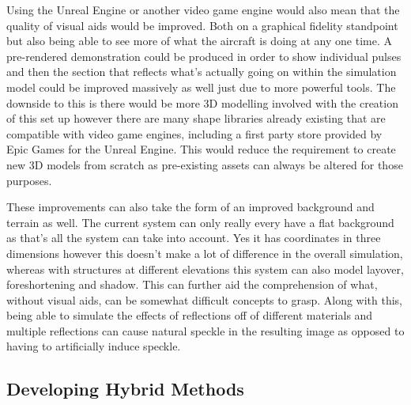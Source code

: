  Using the Unreal Engine or another video game engine would also mean that the quality of visual aids would be improved. Both on a graphical fidelity standpoint but also being able to see more of what the aircraft is doing at any one time. A pre-rendered demonstration could be produced in order to show individual pulses and then the section that reflects what's actually going on within the simulation model could be improved massively as well just due to more powerful tools. The downside to this is there would be more 3D modelling involved with the creation of this set up however there are many shape libraries already existing that are compatible with video game engines, including a first party store provided by Epic Games for the Unreal Engine. This would reduce the requirement to create new 3D models from scratch as pre-existing assets can always be altered for those purposes. \par These improvements can also take the form of an improved background and terrain as well. The current system can only really every have a flat background as that's all the system can take into account. Yes it has coordinates in three dimensions however this doesn't make a lot of difference in the overall simulation, whereas with structures at different elevations this system can also model layover, foreshortening and shadow. This can further aid the comprehension of what, without visual aids, can be somewhat difficult concepts to grasp. Along with this, being able to simulate the effects of reflections off of different materials and multiple reflections can cause natural speckle in the resulting image as opposed to having to artificially induce speckle.
 
 \subsection{Developing Hybrid Methods}
 